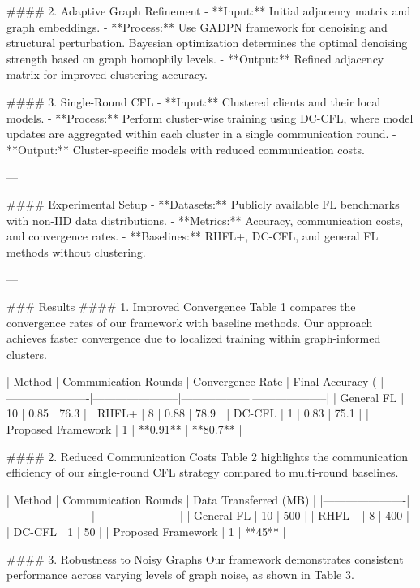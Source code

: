 #### 2. Adaptive Graph Refinement
- **Input:** Initial adjacency matrix and graph embeddings.
- **Process:** Use GADPN framework for denoising and structural perturbation. Bayesian optimization determines the optimal denoising strength based on graph homophily levels.
- **Output:** Refined adjacency matrix for improved clustering accuracy.

#### 3. Single-Round CFL
- **Input:** Clustered clients and their local models.
- **Process:** Perform cluster-wise training using DC-CFL, where model updates are aggregated within each cluster in a single communication round.
- **Output:** Cluster-specific models with reduced communication costs.

---

#### Experimental Setup
- **Datasets:** Publicly available FL benchmarks with non-IID data distributions.
- **Metrics:** Accuracy, communication costs, and convergence rates.
- **Baselines:** RHFL+, DC-CFL, and general FL methods without clustering.

---

### Results
#### 1. Improved Convergence
Table 1 compares the convergence rates of our framework with baseline methods. Our approach achieves faster convergence due to localized training within graph-informed clusters.

| Method               | Communication Rounds | Convergence Rate | Final Accuracy (%
|----------------------|-----------------------|------------------|--------------------|
| General FL           | 10                   | 0.85             | 76.3               |
| RHFL+                | 8                    | 0.88             | 78.9               |
| DC-CFL               | 1                    | 0.83             | 75.1               |
| Proposed Framework   | 1                    | **0.91**         | **80.7**           |

#### 2. Reduced Communication Costs
Table 2 highlights the communication efficiency of our single-round CFL strategy compared to multi-round baselines.

| Method               | Communication Rounds | Data Transferred (MB) |
|----------------------|-----------------------|-----------------------|
| General FL           | 10                   | 500                  |
| RHFL+                | 8                    | 400                  |
| DC-CFL               | 1                    | 50                   |
| Proposed Framework   | 1                    | **45**               |

#### 3. Robustness to Noisy Graphs
Our framework demonstrates consistent performance across varying levels of graph noise, as shown in Table 3.

